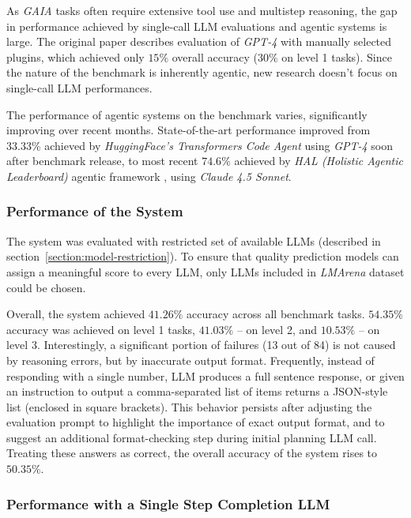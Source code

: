 \documentclass[a4paper,11pt,twoside]{report}
\theoremstyle{definition}
\begin{document}
As \textit{GAIA} tasks often require extensive tool use and multistep reasoning, the gap in performance achieved by single-call LLM evaluations and agentic systems is large. The original paper describes evaluation of \textit{GPT-4} with manually selected plugins, which achieved only $15\%$ overall accuracy ($30\%$ on level 1 tasks). Since the nature of the benchmark is inherently agentic, new research doesn't focus on single-call LLM performances.

The performance of agentic systems on the benchmark varies, significantly improving over recent months. State-of-the-art performance improved from $33.33\%$ achieved by \textit{HuggingFace's Transformers Code Agent} \cite{roucher2024beatinggaia} using \textit{GPT-4} soon after benchmark release, to most recent $74.6\%$ \cite{gaia2025leaderboard} achieved by \textit{HAL (Holistic Agentic Leaderboard)} agentic framework \cite{kapoor2026hal}, using \textit{Claude 4.5 Sonnet}.

\subsubsection{Performance of the System}

The system was evaluated with restricted set of available LLMs (described in section~\ref{section:model-restriction}). To ensure that quality prediction models can assign a meaningful score to every LLM, only LLMs included in \textit{LMArena} dataset could be chosen.

Overall, the system achieved $41.26 \%$ accuracy across all benchmark tasks. $54.35 \%$ accuracy was achieved on level 1 tasks, $41.03 \%$ -- on level 2, and $10.53 \%$ -- on level 3. Interestingly, a significant portion of failures (13 out of 84) is not caused by reasoning errors, but by inaccurate output format. Frequently, instead of responding with a single number, LLM produces a full sentence response, or given an instruction to output a comma-separated list of items returns a JSON-style list (enclosed in square brackets). This behavior persists after adjusting the evaluation prompt to highlight the importance of exact output format, and to suggest an additional format-checking step during initial planning LLM call. Treating these answers as correct, the overall accuracy of the system rises to $50.35 \%$.

\subsubsection{Performance with a Single Step Completion LLM}
\end{document}
